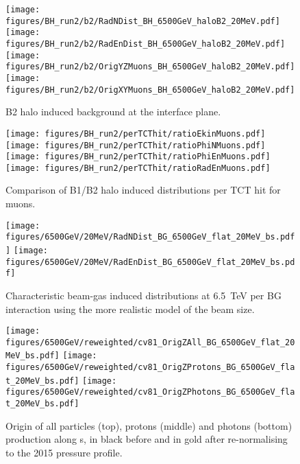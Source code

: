 \begin{figure}%
\centering
\texttt{[image: figures/BH\_run2/b2/RadNDist\_BH\_6500GeV\_haloB2\_20MeV.pdf]}
\texttt{[image: figures/BH\_run2/b2/RadEnDist\_BH\_6500GeV\_haloB2\_20MeV.pdf]}
\texttt{[image: figures/BH\_run2/b2/OrigYZMuons\_BH\_6500GeV\_haloB2\_20MeV.pdf]}
\texttt{[image: figures/BH\_run2/b2/OrigXYMuons\_BH\_6500GeV\_haloB2\_20MeV.pdf]}
 \caption{B2 halo induced background at the interface plane. 
  \label{dist6500GeVB22}}
\end{figure}

\begin{figure}%
\begin{center}
  \texttt{[image: figures/BH\_run2/perTCThit/ratioEkinMuons.pdf]}
  \texttt{[image: figures/BH\_run2/perTCThit/ratioPhiNMuons.pdf]}
  \texttt{[image: figures/BH\_run2/perTCThit/ratioPhiEnMuons.pdf]}
  \texttt{[image: figures/BH\_run2/perTCThit/ratioRadEnMuons.pdf]}
\end{center}
\vspace{-0.6cm}
 \caption{Comparison of B1/B2 halo induced distributions per TCT hit for muons.
  \label{compBHB1B2run2}}
\end{figure}

\newpage

\begin{figure}%
\begin{center}
  \texttt{[image: figures/6500GeV/20MeV/RadNDist\_BG\_6500GeV\_flat\_20MeV\_bs.pdf]}
  \texttt{[image: figures/6500GeV/20MeV/RadEnDist\_BG\_6500GeV\_flat\_20MeV\_bs.pdf]}
\end{center}
\vspace{-0.6cm}
 \caption{Characteristic beam-gas induced distributions at 6.5~TeV per BG interaction using the more realistic model of the beam size.
  \label{bg65002}}
\end{figure}

\begin{figure}
\begin{center}
  \texttt{[image: figures/6500GeV/reweighted/cv81\_OrigZAll\_BG\_6500GeV\_flat\_20MeV\_bs.pdf]}
  \texttt{[image: figures/6500GeV/reweighted/cv81\_OrigZProtons\_BG\_6500GeV\_flat\_20MeV\_bs.pdf]}
  \texttt{[image: figures/6500GeV/reweighted/cv81\_OrigZPhotons\_BG\_6500GeV\_flat\_20MeV\_bs.pdf]}
\end{center}
\vspace{-0.6cm}
 \caption{Origin of all particles (top), protons (middle) and photons (bottom) production along s, in black before and in gold after re-normalising to the 2015 pressure profile. 
  \label{fig:OrigZ6p52}}
\end{figure}


